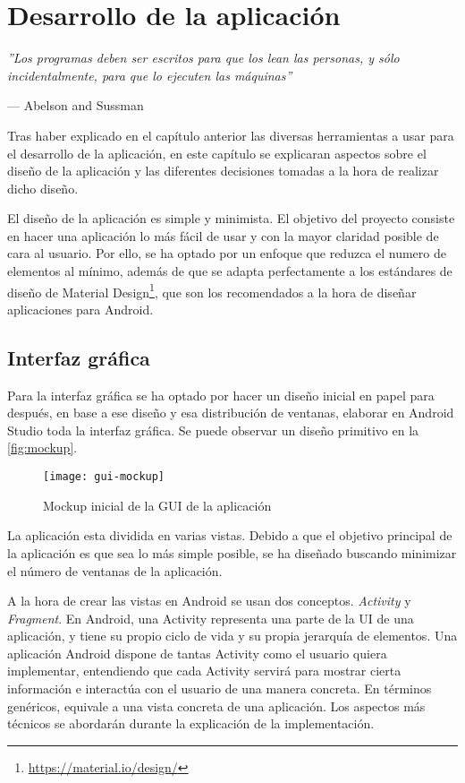 \chapter{Desarrollo de la aplicación}

\epigraph{\textit{''Los programas deben ser escritos para que los lean las personas, y sólo incidentalmente, para que lo ejecuten las máquinas''}}{--- Abelson and Sussman}

Tras haber explicado en el capítulo anterior las diversas herramientas a usar para el desarrollo de la aplicación, en este capítulo se explicaran aspectos sobre el diseño de la aplicación y las diferentes decisiones tomadas a la hora de realizar dicho diseño.

El diseño de la aplicación es simple y minimista. El objetivo del proyecto consiste en hacer una aplicación lo más fácil de usar y con la mayor claridad posible de cara al usuario. Por ello, se ha optado por un enfoque que reduzca el numero de elementos al mínimo, además de que se adapta perfectamente a los estándares de diseño de Material Design\footnote{\url{https://material.io/design/}}, que son los recomendados a la hora de diseñar aplicaciones para Android.

\section{Interfaz gráfica}

Para la interfaz gráfica se ha optado por hacer un diseño inicial en papel para después, en base a ese diseño y esa distribución de ventanas, elaborar en Android Studio toda la interfaz gráfica. Se puede observar un diseño primitivo en la \autoref{fig:mockup}.

\begin{figure}[ht]
	\centering
	\texttt{[image: gui-mockup]}
	\caption{Mockup inicial de la GUI de la aplicación}
	\label{fig:mockup}
\end{figure}

La aplicación esta dividida en varias vistas. Debido a que el objetivo principal de la aplicación es que sea lo más simple posible, se ha diseñado buscando minimizar el número de ventanas de la aplicación.

A la hora de crear las vistas en Android se usan dos conceptos. \textit{Activity} y \textit{Fragment}. En Android, una Activity representa una parte de la UI de una aplicación, y tiene su propio ciclo de vida y su propia jerarquía de elementos. Una aplicación Android dispone de tantas Activity como el usuario quiera implementar, entendiendo que cada Activity servirá para mostrar cierta información e interactúa con el usuario de una manera concreta. En términos genéricos, equivale a una vista concreta de una aplicación. Los aspectos más técnicos se abordarán durante la explicación de la implementación.


